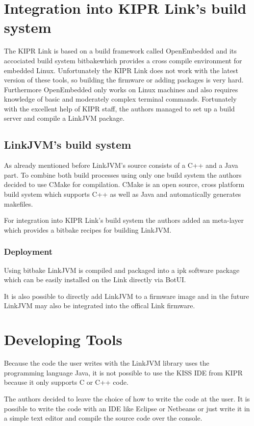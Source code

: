 \documentclass{juniorjournal}
\begin{document}
\section{Integration into KIPR Link's build system}
The KIPR Link is based on a build framework called OpenEmbedded \cite{openembedded} and its accociated build system \frqq bitbake\flqq  which provides a cross compile environment for embedded Linux\cite{Look_Inside_Kipr_Link}.
Unfortunately the KIPR Link does not work with the latest version of these tools, so building the firmware or adding packages is very hard.
Furthermore OpenEmbedded only works on Linux machines and also requires knowledge of basic and moderately complex terminal commands.
Fortunately with the excellent help of KIPR staff, the authors managed to set up a build server and compile a LinkJVM package.

\subsection{LinkJVM's build system}
As already mentioned before LinkJVM's source consists of a C++ and a Java part.
To combine both build processes using only one build system the authors decided to use CMake\cite{cmake} for compilation.
CMake is an open source, cross platform build system which supports C++ as well as Java and automatically generates makefiles.

For integration into KIPR Link's build system the authors added an meta-layer which provides a bitbake recipes for building LinkJVM.

\subsubsection{Deployment}
Using bitbake LinkJVM is compiled and packaged into a ipk software package which can be easily installed on the Link directly via BotUI.

It is also possible to directly add LinkJVM to a firmware image and in the future LinkJVM may also be integrated into the offical Link firmware.
\section{Developing Tools}
\label{sec:developing-tools}
Because the code the user writes with the LinkJVM library uses the programming
language Java, it is not possible to use the KISS IDE from KIPR because it only
supports C or C++ code.

The authors decided to leave the choice of how to write the code at the user. It
is possible to write the code with an IDE like Eclipse or Netbeans or just write
it in a simple text editor and compile the source code over the console.
\end{document}
